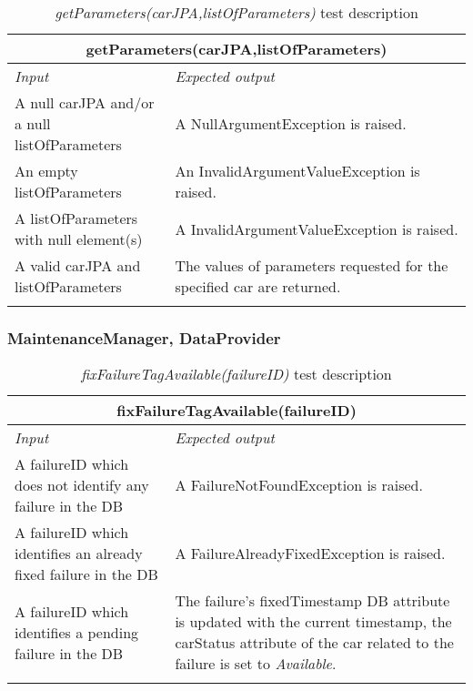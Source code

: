 \begin{longtable}{p{0.35\linewidth}p{0.65\linewidth}}
\multicolumn{2}{c}{\textbf{getParameters(carJPA,listOfParameters)}} \\
\toprule
\emph{Input} & \emph{Expected output} \\
\midrule
A null carJPA and/or a null listOfParameters & A NullArgumentException is raised.\\
\midrule
An empty listOfParameters & An InvalidArgumentValueException is raised. \\
\midrule
A listOfParameters with null element(s) & A InvalidArgumentValueException is raised.\\
\midrule
A valid carJPA and listOfParameters & The values of parameters requested for the specified car are returned. \\
\bottomrule
\caption{\emph{getParameters(carJPA,listOfParameters)} test description}
\end{longtable}

\subsubsection{MaintenanceManager, DataProvider}

\begin{longtable}{p{0.35\linewidth}p{0.65\linewidth}}
\multicolumn{2}{c}{\textbf{fixFailureTagAvailable(failureID)}} \\
\toprule
\emph{Input} & \emph{Expected output} \\
\midrule
A failureID which does not identify any failure in the DB & A FailureNotFoundException is raised.\\
\midrule
A failureID which identifies an already fixed failure in the DB & A FailureAlreadyFixedException is raised.\\
\midrule
A failureID which identifies a pending failure in the DB & The failure's fixedTimestamp DB attribute is updated with the current timestamp, the carStatus attribute of the car related to the failure is set to \emph{Available}.\\
\bottomrule
\caption{\emph{fixFailureTagAvailable(failureID)} test description}
\end{longtable}

